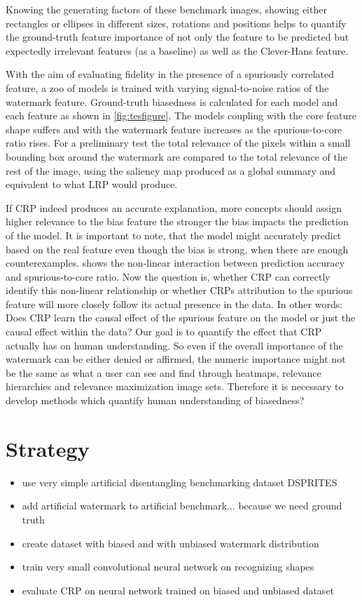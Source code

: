 Knowing the generating factors of these benchmark images, showing either rectangles or ellipses in different sizes, rotations and positions helps to quantify the ground-truth feature importance of not only the feature to be predicted but expectedly irrelevant features (as a baseline) as well as the Clever-Hans feature. 

With the aim of evaluating fidelity in the presence of a spuriously correlated feature, a zoo of models is trained with varying signal-to-noise ratios of the watermark feature. Ground-truth biasedness is calculated for each model and each feature as shown in \cref{fig:tesfigure}. The models coupling with the core feature shape suffers and with the watermark feature increases as the spurious-to-core ratio rises. 
For a preliminary test the total relevance of the pixels within a small bounding box around the watermark are compared to the total relevance of the rest of the image, using the saliency map produced as a global summary and equivalent to what LRP would produce. 

If CRP indeed produces an accurate explanation, more concepts should assign higher relevance to the bias feature the stronger the bias impacts the prediction of the model. It is important to note, that the model might accurately predict based on the real feature even though the bias is strong, when there are enough counterexamples.  shows the non-linear interaction between prediction accuracy and spurious-to-core ratio.
Now the question is, whether CRP can correctly identify this non-linear relationship or whether CRPs attribution to the spurious feature will more closely follow its actual presence in the data. 
In other words: Does CRP learn the causal effect of the spurious feature on the model or just the causal effect within the data? Our goal is to quantify the effect that CRP actually has on human understanding. So even if the overall importance of the watermark can be either denied or affirmed, the numeric importance might not be the same as what a user can see and find through heatmaps, relevance hierarchies and relevance maximization image sets. Therefore it is necessary to develop methods which quantify human understanding of biasedness?  

\section{Strategy}
\begin{itemize}
    \item use very simple artificial disentangling benchmarking dataset DSPRITES
    \item add artificial watermark to artificial benchmark... because we need ground truth
    \item create dataset with biased and with unbiased watermark distribution
    \item train very small convolutional neural network on recognizing shapes
    \item evaluate CRP on neural network trained on biased and unbiased dataset
\end{itemize}

